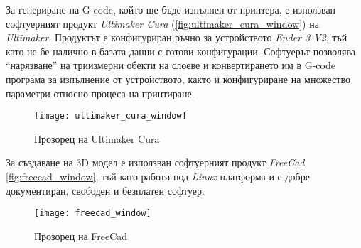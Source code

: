 За генериране на G-code, който ще бъде изпълнен от принтера, е използван софтуерният продукт
\textit{Ultimaker Cura} (\autoref{fig:ultimaker_cura_window}) на \textit{Ultimaker}.
Продуктът е конфигуриран ръчно за устройството \textit{Ender 3 V2}, тъй като не бе налично
в базата данни с готови конфигурации. 
Софтуерът позволява \enquote{нарязване} на триизмерни обекти на слоеве и конвертирането им в G-code програма за изпълнение от
устройството, както и конфигуриране на множество параметри относно процеса на принтиране.

\begin{figure}[htpb!]
    \centering
    \texttt{[image: ultimaker\_cura\_window]}
    \caption{Прозорец на Ultimaker Cura}
    \label{fig:ultimaker_cura_window}
\end{figure}

За създаване на 3D модел е използван софтуерният продукт \textit{FreeCad} \autoref{fig:freecad_window},
тъй като работи под \textit{Linux} платформа и е добре документиран, свободен и безплатен софтуер.

\begin{figure}[htpb!]
    \centering
    \texttt{[image: freecad\_window]}
    \caption{Прозорец на FreeCad}
    \label{fig:freecad_window}
\end{figure}

\FloatBarrier




